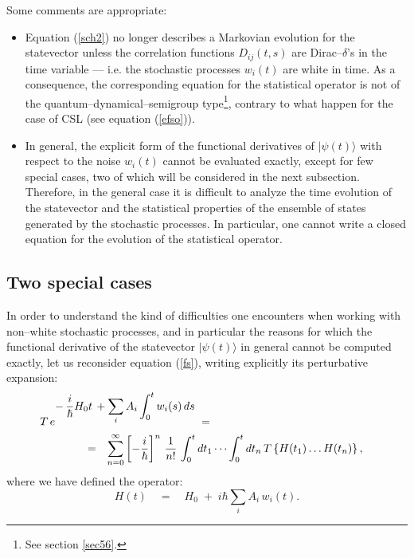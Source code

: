 \documentclass[10pt,a4paper]{article}
\begin{document}
Some comments are appropriate:
\begin{itemize}
\item Equation (\ref{sch2}) no longer describes a Markovian
evolution for the sta\-te\-vector unless the correlation functions
$D_{ij}(t,s)$ are Dirac--$\delta$'s in the time variable --- i.e.
the stochastic processes $w_{i}(t)$ are white in time. As a
consequence, the corresponding equation for the statistical
operator is not of the quantum--dynamical--semigroup
type\footnote{See section \ref{sec56}.}, contrary to what happen
for the case of CSL (see equation (\ref{efso})).

\item In general,  the explicit form of the functional derivatives
of $|\psi(t)\rangle$ with respect to the noise $w_{i}(t)$ cannot
be evaluated exactly, except for few special cases, two of which
will be considered in the next subsection. Therefore, in the
general case it is difficult to analyze the time evolution of the
statevector and the statistical properties of the ensemble of
states generated by the stochastic processes. In particular, one
cannot write a closed equation for the evolution of the
statistical operator.
\end{itemize}


\subsection{Two special cases} \label{nsec2}

In order to understand the kind of difficulties one encounters
when working with non--white stochastic processes, and in
particular the reasons for which the functional derivative of the
statevector $|\psi(t)\rangle$ in general cannot be computed
exactly, let us reconsider equation (\ref{fs}), writing explicitly
its perturbative expansion:
\begin{eqnarray} \label{fs2}
\lefteqn{ T\, e^{\displaystyle -\, \frac{i}{\hbar}H_{0}t\, +
\sum_{i} A_{i} \int_{0}^{t} w_{i}(s)\, ds } \; =} \qquad\qquad
\nonumber \\
& = & \sum_{n = 0}^{\infty} \left[-\frac{i}{\hbar}\right]^{n}\,
\frac{1}{n!} \, \int_{0}^{t} dt_{1} \cdots \int_{0}^{t} dt_{n}\,
T\left\{H(t_{1}) \ldots H(t_{n}) \right\}, \quad
\end{eqnarray}
where we have defined the operator:
\begin{equation} \label{yhj}
H(t) \quad = \quad H_{0} \; + \; i\hbar\sum_{i}A_{i}\,w_{i}(t).
\end{equation}
\end{document}
